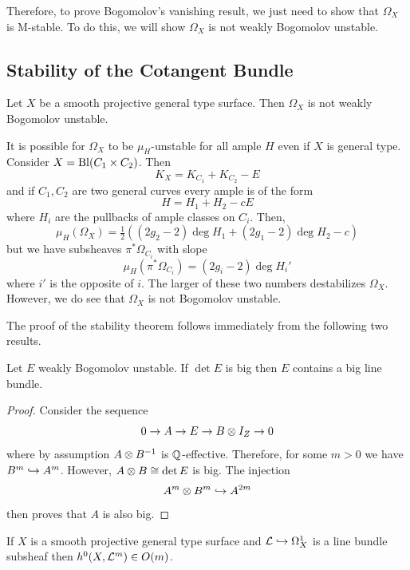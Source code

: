 \documentclass[main.tex]{subfiles}
\begin{document}
Therefore, to prove Bogomolov's vanishing result, we just need to show that $\Omega_X$ is M-stable. To do this, we will show $\Omega_X$ is not weakly Bogomolov unstable.


\subsection{Stability of the Cotangent Bundle}

\begin{theorem}
Let $X$ be a smooth projective general type surface. Then $\Omega_X$ is not weakly Bogomolov unstable.
\end{theorem}

\begin{example}
It is possible for $\Omega_X$ to be $\mu_H$-unstable for all ample $H$ even if $X$ is general type.  Consider $X = \mathrm{Bl} (C_1 \times C_2)$. Then
\[ K_X = K_{C_1} + K_{C_2} - E \]
and if $C_1, C_2$ are two general curves every ample is of the form
\[ H = H_1 + H_2 - c E \]
where $H_i$ are the pullbacks of ample classes on $C_i$. Then,
\[ \mu_H(\Omega_X) = \tfrac{1}{2} ((2g_2 - 2) \deg{H_1} + (2g_1 - 2) \deg{H_2} - c) \]
but we have subsheaves $\pi^* \Omega_{C_i}$ with slope
\[ \mu_H(\pi^* \Omega_{C_i}) = (2g_i - 2) \deg{H_i'} \]
where $i'$ is the opposite of $i$.
The larger of these two numbers destabilizes $\Omega_X$. However, we do see that $\Omega_X$ is not Bogomolov unstable.
\end{example}

The proof of the stability theorem follows immediately from the following two results.

\begin{lemma}
Let $E$ weakly Bogomolov unstable. If $\det{E}$ is big then $E$ contains a big line bundle.
\end{lemma}

\begin{proof}
Consider the sequence
\[ 0 \to A \to E \to B \otimes I_Z \to 0 \]
where by assumption $A \otimes B^{-1}$ is $\mathbb{Q}$-effective. Therefore, for some $m > 0$ we have $B^m \hookrightarrow A^m$. However, $A \otimes B \cong \det{E}$ is big. The injection
\[ A^m \otimes B^m \hookrightarrow A^{2m} \]
then proves that $A$ is also big.
\end{proof}

\begin{theorem}[Bogomolov]
If $X$ is a smooth projective general type surface and $\mathcal{L} \hookrightarrow \Omega_X^1$ is a line bundle subsheaf then $h^0(X, \mathcal{L}^m) \in O(m)$.
\end{theorem}
\end{document}
